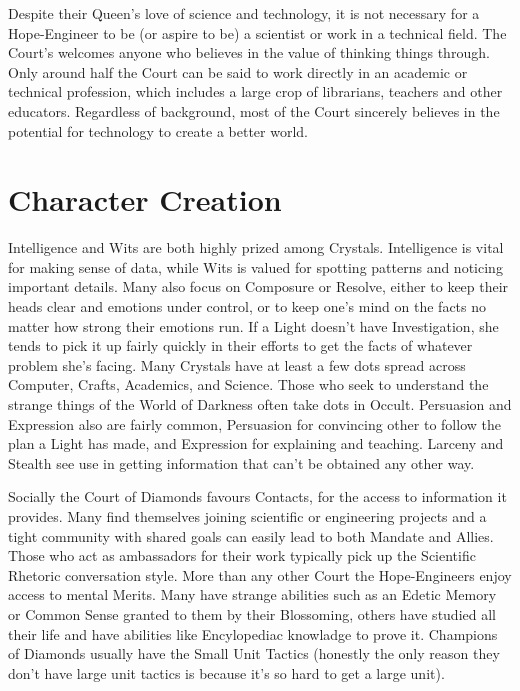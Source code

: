 Despite their Queen's love of science and technology, it is not necessary for a Hope-Engineer to be (or aspire to be) a scientist or work in a technical field. The Court's welcomes anyone who believes in the value of thinking things through. Only around half the Court can be said to work directly in an academic or technical profession, which includes a large crop of librarians, teachers and other educators. Regardless of background, most of the Court sincerely believes in the potential for technology to create a better world. 

\section*{Character Creation}
Intelligence and Wits are both highly prized among Crystals. Intelligence is vital for making sense of data, while Wits is valued for spotting patterns and noticing important details. Many also focus on Composure or Resolve, either to keep their heads clear and emotions under control, or to keep one's mind on the facts no matter how strong their emotions run. If a Light doesn't have Investigation, she tends to pick it up fairly quickly in their efforts to get the facts of whatever problem she's facing. Many Crystals have at least a few dots spread across Computer, Crafts, Academics, and Science. Those who seek to understand the strange things of the World of Darkness often take dots in Occult. Persuasion and Expression also are fairly common, Persuasion for convincing other to follow the plan a Light has made, and Expression for explaining and teaching. Larceny and Stealth see use in getting information that can't be obtained any other way.

Socially the Court of Diamonds favours Contacts, for the access to information it provides. Many find themselves joining scientific or engineering projects and a tight community with shared goals can easily lead to both Mandate and Allies. Those who act as ambassadors for their work typically pick up the Scientific Rhetoric conversation style. More than any other Court the Hope-Engineers enjoy access to mental Merits. Many have strange abilities such as an Edetic Memory or Common Sense granted to them by their Blossoming, others have studied all their life and have abilities like Encylopediac knowladge to prove it. Champions of Diamonds usually have the Small Unit Tactics (honestly the only reason they don't have large unit tactics is because it's so hard to get a large unit).

